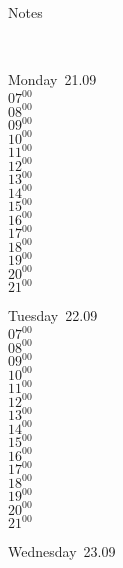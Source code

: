 \documentclass[11pt,a4paper]{book}\usepackage[]{graphicx}\usepackage[]{color}
\begin{document}
{{{{{{{{{{{%
\begin{tcolorbox}[height=(\textheight-10mm)/6,sidebyside=false]
Notes
\end{tcolorbox}
\clearpage
\vspace{2 mm}\\
%
%
\begin{tcolorbox}
Monday~21.09\\
{ 
$07^{00}$\\
$08^{00}$\\
$09^{00}$\\
$10^{00}$\\
$11^{00}$\\
$12^{00}$\\
$13^{00}$\\
$14^{00}$\\
$15^{00}$\\
$16^{00}$\\
$17^{00}$\\
$18^{00}$\\
$19^{00}$\\
$20^{00}$\\
$21^{00}$}\\
\end{tcolorbox}
%
\begin{tcolorbox}
Tuesday~22.09\\
{ 
$07^{00}$\\
$08^{00}$\\
$09^{00}$\\
$10^{00}$\\
$11^{00}$\\
$12^{00}$\\
$13^{00}$\\
$14^{00}$\\
$15^{00}$\\
$16^{00}$\\
$17^{00}$\\
$18^{00}$\\
$19^{00}$\\
$20^{00}$\\
$21^{00}$}\\
\end{tcolorbox}
%
\begin{tcolorbox}
Wednesday~23.09\\

\end{tcolorbox}}}}}}}}}}}}
\end{document}
